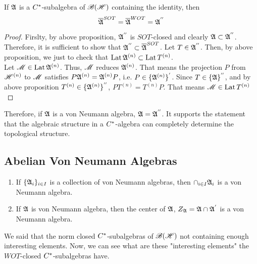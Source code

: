 \documentclass[a4paper,11pt]{report}
\begin{document}
\begin{thm}
	If $\mathfrak{A}$ is a $C^{*}$-subalgebra of $\mathscr{B(H)}$ containing the identity, then
	\begin{equation*}
		\overline{\mathfrak{A}}^{SOT} = \overline{\mathfrak{A}}^{WOT} = \mathfrak{A}^{''}
	\end{equation*}
\end{thm}
\begin{proof}
	Firslty, by above proposition, $\mathfrak{A}^{''}$ is $SOT$-closed and clearly $\mathfrak{A} \subset \mathfrak{A}^{''}$. Therefore, it is sufficient to show that $\mathfrak{A}^{''} \subset \overline{\mathfrak{A}}^{SOT}$. Let $T \in \mathfrak{A}^{''}$. Then, by above proposition, we just to check that $\operatorname{Lat}{\mathfrak{A}^{(n)}} \subset \operatorname{Lat}{T^{(n)}}$. \\
	Let $\mathscr{M} \in \operatorname{Lat}{\mathfrak{A}^{(n)}}$. Thus, $\mathscr{M}$ reduces $\mathfrak{A}^{(n)}$. That means the projection $P$ from $\mathscr{H}^{(n)}$ to $\mathscr{M}$ satisfies $P\mathfrak{A}^{(n)} = \mathfrak{A}^{(n)}P$, i.e. $P \in \{\mathfrak{A}^{(n)}\}^{'}$. Since $T \in \{\mathfrak{A}\}^{''}$, and by above proposition $T^{(n)} \in \{\mathfrak{A}^{(n)}\}^{''}$, $PT^{(n)} = T^{(n)}P$. That means $\mathscr{M} \in \operatorname{Lat}{T^{(n)}}$
\end{proof}
\begin{rem}
	Therefore, if $\mathfrak{A}$ is a von Neumann algebra, $\mathfrak{A} = \mathfrak{A}^{''}$. It supports the statement that the algebraic structure in a $C^{*}$-algebra can completely determine the topological structure.
\end{rem}

\subsection{Abelian Von Neumann Algebras}

\begin{prop}
	\begin{enumerate}[label=\arabic*)]
		\item If $\{\mathfrak{A}_i\}_{i \in I}$ is a collection of von Neumann algebras, then $\cap_{i \in I} \mathfrak{A}_i$ is a von Neumann algebra.
		\item If $\mathfrak{A}$ is von Neumann algebra, then the center of $\mathfrak{A}$, $Z_{\mathfrak{A}} = \mathfrak{A} \cap \mathfrak{A}^{'}$ is a von Neumann algebra.
	\end{enumerate}
\end{prop}

We said that the norm closed $C^{*}$-subalgebras of $\mathscr{B(H)}$ not containing enough interesting elements. Now, we can see what are these "interesting elements" the $WOT$-closed $C^{*}$-subalgebras have.
\end{document}
